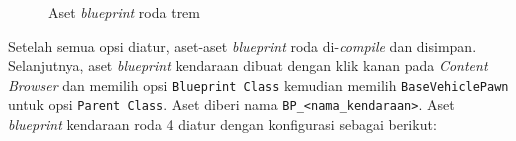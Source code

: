 \begin{figure}[!ht]
    \centering
    \hfill
    \caption{Aset \textit{blueprint} roda trem}
    \label{fig:tram-wheel-blueprints}
\end{figure}

Setelah semua opsi diatur, aset-aset \textit{blueprint} roda di-\textit{compile}
dan disimpan. Selanjutnya, aset \textit{blueprint} kendaraan dibuat dengan klik
kanan pada \textit{Content Browser} dan memilih opsi \verb|Blueprint Class|
kemudian memilih \verb|BaseVehiclePawn| untuk opsi \verb|Parent Class|. Aset
diberi nama \verb|BP_<nama_kendaraan>|. Aset \textit{blueprint} kendaraan roda 4
diatur dengan konfigurasi sebagai berikut:

